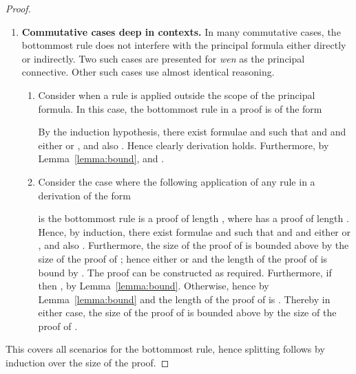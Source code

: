 \begin{proof}
\begin{enumerate}[label=\textbf{\Alph*},ref=\Alph*,leftmargin=*]
{}  




\item \textbf{Commutative cases deep in contexts.}
In many commutative cases, the bottommost rule does not interfere with the principal formula either directly or indirectly. Two such cases are presented for \textit{wen} as the principal connective. Other such cases use almost identical reasoning.

\begin{enumerate}[label*=\textbf{.\arabic*}]

\item Consider when a rule is applied outside the scope of the principal formula.
In this case, the bottommost rule in a proof is of the form

By the induction hypothesis, there exist formulae  and  such that  and  and either  or , and also .
Hence clearly derivation 
 holds.
Furthermore, by Lemma~\ref{lemma:bound},  
and .



\item Consider the case where the following application of any rule in a derivation of the form 

is the bottommost rule is a proof of length , where  has a proof of length .
Hence, by induction, there exist formulae  and  such that  and  and either  or , and also
.
Furthermore, the size of the proof of  is bounded above by the size of the proof of ; hence either  or  and the length of the proof of  is bound by .
The proof 
 can be constructed as required.
Furthermore, if  then , by Lemma~\ref{lemma:bound}. Otherwise, 
hence  by Lemma~\ref{lemma:bound} and the length of the proof of  is .
Thereby in either case, the size of the proof of  is bounded above by the size of the proof of .
\end{enumerate}
 
\end{enumerate}

This covers all scenarios for the bottommost rule, hence splitting follows by induction over the size of the proof.
\end{proof}
